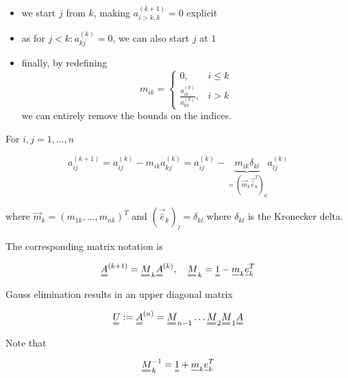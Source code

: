 \begin{itemize}
    \item we start $j$ from $k$, making $a_{i>k,k}^{(k+1)} = 0$ explicit
    \item as for $j<k: a_{kj}^{(k)} = 0$, we can also start $j$ at $1$
    \item finally, by redefining
        \begin{equation}
            m_{ik} = \begin{cases}
                0, &i \leq k \\
                \frac{a^{(k)}_{ik}}{a^{(k)}_{kk}}, &i>k
            \end{cases}
        \end{equation}
    we can entirely remove the bounds on the indices.
\end{itemize}

For $i,j=1, ..., n$

\begin{equation}
    a_{ij}^{(k+1)} = a_{ij}^{(k)} - m_{ik} a_{kj}^{(k)} = a_{ij}^{(k)} - \underbrace{m_{ik} \delta_{kl}}_{=(\vec{m}_k \vec{\hat{e}}_k^T)_{il}} a_{lj}^{(k)}
\end{equation}

where $\vec{m}_k = (m_{1k},...,m_{nk})^T$ and $(\vec{\hat{e}}_k)_l = \delta_{kl}$ where $\delta_{kl}$ is the Kronecker delta.


The corresponding matrix notation is

\begin{equation}
    \mat{A}^{(k+1)} = \mat{M}_k \mat{A}^{(k)}, \quad \mat{M}_k = \mat{1} - \vec{m}_k \vec{e}_k^T
\end{equation}


Gauss elimination results in an upper diagonal matrix

\begin{equation}
    \mat{U} := \mat{A}^{(n)} = \mat{M}_{n-1} \dots \mat{M}_{2} \mat{M}_{1} \mat{A}
\end{equation}

Note that

\begin{equation}
    \mat{M}_{k}^{-1} = \mat{1} + \vec{m}_k \vec{e}_k^T
\end{equation}

